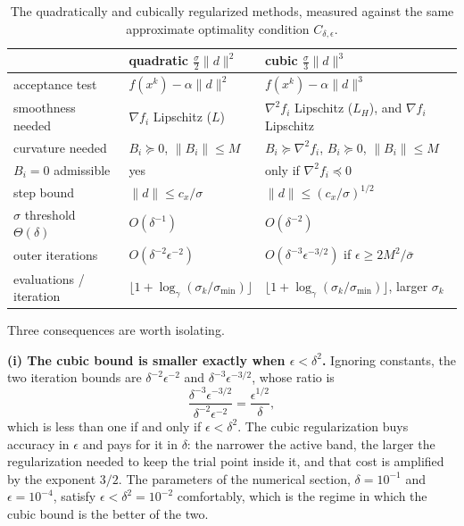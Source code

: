 \documentclass[11pt]{article}
\begin{document}
\begin{table}[ht]
\centering
\begin{tabular}{lll}
\toprule
 & quadratic $\tfrac{\sigma}{2}\|d\|^2$ & cubic $\tfrac{\sigma}{3}\|d\|^3$ \\
\midrule
acceptance test & $f(x^k) - \alpha\|d\|^2$ & $f(x^k) - \alpha\|d\|^3$ \\
smoothness needed & $\nabla f_i$ Lipschitz ($L$)
   & $\nabla^2 f_i$ Lipschitz ($L_H$), and $\nabla f_i$ Lipschitz \\
curvature needed & $B_i \succeq 0$, $\|B_i\| \leq M$
   & $B_i \succeq \nabla^2 f_i$, $B_i \succeq 0$, $\|B_i\|\leq M$ \\
$B_i = 0$ admissible & yes & only if $\nabla^2 f_i \preceq 0$ \\
step bound & $\|d\| \leq c_x/\sigma$ & $\|d\| \leq (c_x/\sigma)^{1/2}$ \\
$\sigma$ threshold $\Theta(\delta)$ & $O(\delta^{-1})$ & $O(\delta^{-2})$ \\
outer iterations & $O(\delta^{-2}\epsilon^{-2})$
   & $O(\delta^{-3}\epsilon^{-3/2})$ \quad if $\epsilon \geq 2M^2/\bar\sigma$ \\
evaluations / iteration & $\lfloor 1 + \log_\gamma(\sigma_k/\sigma_{\min})\rfloor$
   & $\lfloor 1 + \log_\gamma(\sigma_k/\sigma_{\min})\rfloor$, larger $\sigma_k$ \\
\bottomrule
\end{tabular}
\caption{The quadratically and cubically regularized methods, measured against
the same approximate optimality condition $C_{\delta,\epsilon}$.}
\label{tab:comparison}
\end{table}

Three consequences are worth isolating.

\medskip
\noindent\textbf{(i) The cubic bound is smaller exactly when
$\epsilon < \delta^2$.} Ignoring constants, the two iteration bounds are
$\delta^{-2}\epsilon^{-2}$ and $\delta^{-3}\epsilon^{-3/2}$, whose ratio is
\[
\frac{\delta^{-3}\epsilon^{-3/2}}{\delta^{-2}\epsilon^{-2}}
= \frac{\epsilon^{1/2}}{\delta},
\]
which is less than one if and only if $\epsilon < \delta^2$. The cubic
regularization buys accuracy in $\epsilon$ and pays for it in $\delta$: the
narrower the active band, the larger the regularization needed to keep the
trial point inside it, and that cost is amplified by the exponent $3/2$. The
parameters of the numerical section, $\delta = 10^{-1}$ and
$\epsilon = 10^{-4}$, satisfy $\epsilon < \delta^2 = 10^{-2}$ comfortably,
which is the regime in which the cubic bound is the better of the two.
\end{document}
